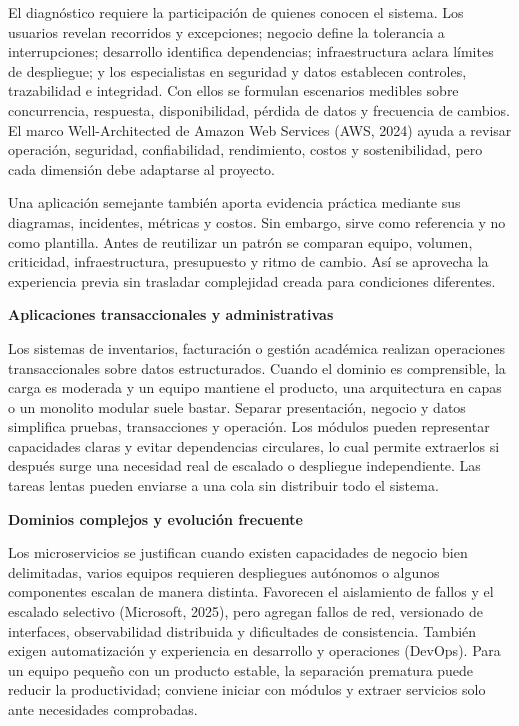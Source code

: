 \documentclass[12pt,letterpaper]{article}
\begin{document}
El diagnóstico requiere la participación de quienes conocen el sistema. Los usuarios revelan recorridos y excepciones; negocio define la tolerancia a interrupciones; desarrollo identifica dependencias; infraestructura aclara límites de despliegue; y los especialistas en seguridad y datos establecen controles, trazabilidad e integridad. Con ellos se formulan escenarios medibles sobre concurrencia, respuesta, disponibilidad, pérdida de datos y frecuencia de cambios. El marco Well-Architected de Amazon Web Services (AWS, 2024) ayuda a revisar operación, seguridad, confiabilidad, rendimiento, costos y sostenibilidad, pero cada dimensión debe adaptarse al proyecto.

Una aplicación semejante también aporta evidencia práctica mediante sus diagramas, incidentes, métricas y costos. Sin embargo, sirve como referencia y no como plantilla. Antes de reutilizar un patrón se comparan equipo, volumen, criticidad, infraestructura, presupuesto y ritmo de cambio. Así se aprovecha la experiencia previa sin trasladar complejidad creada para condiciones diferentes.

\textbf{Aplicaciones transaccionales y administrativas}\par
Los sistemas de inventarios, facturación o gestión académica realizan operaciones transaccionales sobre datos estructurados. Cuando el dominio es comprensible, la carga es moderada y un equipo mantiene el producto, una arquitectura en capas o un monolito modular suele bastar. Separar presentación, negocio y datos simplifica pruebas, transacciones y operación. Los módulos pueden representar capacidades claras y evitar dependencias circulares, lo cual permite extraerlos si después surge una necesidad real de escalado o despliegue independiente. Las tareas lentas pueden enviarse a una cola sin distribuir todo el sistema.

\textbf{Dominios complejos y evolución frecuente}\par
Los microservicios se justifican cuando existen capacidades de negocio bien delimitadas, varios equipos requieren despliegues autónomos o algunos componentes escalan de manera distinta. Favorecen el aislamiento de fallos y el escalado selectivo (Microsoft, 2025), pero agregan fallos de red, versionado de interfaces, observabilidad distribuida y dificultades de consistencia. También exigen automatización y experiencia en desarrollo y operaciones (DevOps). Para un equipo pequeño con un producto estable, la separación prematura puede reducir la productividad; conviene iniciar con módulos y extraer servicios solo ante necesidades comprobadas.
\end{document}
